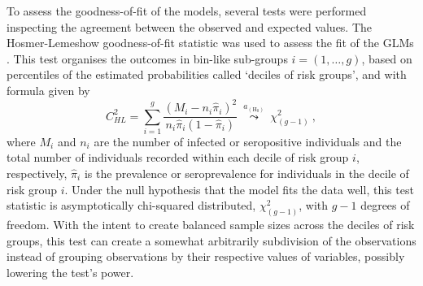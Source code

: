 To assess the goodness-of-fit of the models, several tests were performed inspecting the agreement between the observed and expected values.
The Hosmer-Lemeshow goodness-of-fit statistic was used to assess the fit of the GLMs \cite{hosmer2013applied}.
This test organises the outcomes in bin-like sub-groups $i=(1,\ldots,g)$, based on percentiles of the estimated probabilities called `deciles of risk groups', and with formula given by
%
\begin{equation}
    \label{eq:hosmer.lemeshow}
    C_{HL}^2= \sum_{i=1}^g\frac{(M_{i}-n_{i}\hat{\pi}_{i})^2}{n_{i}\hat{\pi}_{i}\left(1-\hat{\pi}_{i}\right)}\ \overset{a_{\left(\text{H}_0\right)}}{\leadsto}\    \chi_{(g-1)}^{2}\ ,
\end{equation}
%
\noindent
where $M_{i}$ and $n_{i}$ are the number of infected or seropositive individuals and the total number of individuals recorded within each decile of risk group $i$, respectively, $\hat{\pi}_{i}$ is the prevalence or seroprevalence for individuals in the decile of risk group $i$.
Under the null hypothesis that the model fits the data well, this test statistic is asymptotically chi-squared distributed, $\chi_{(g-1)}^{2}$, with $g-1$ degrees of freedom.
With the intent to create balanced sample sizes across the deciles of risk groups, this test can create a somewhat arbitrarily subdivision of the observations instead of grouping observations by their respective values of variables, possibly lowering the test's power.


